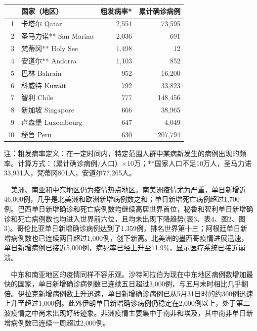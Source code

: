 \documentclass[
]{article}
\begin{document}
\begin{table}[H]
\begin{minipage}{.7\linewidth}
\begin{table}[H]
\begin{tabular}{rlrr}
\toprule
  & 国家（地区） & 粗发病率* & 累计确诊病例\\
\midrule
\rowcolor{gray!6}  1 & 卡塔尔 Qatar & 2,554 & 73,595\\
2 & 圣马力诺** San Marino & 2,036 & 691\\
\rowcolor{gray!6}  3 & 梵蒂冈** Holy See & 1,498 & 12\\
4 & 安道尔** Andorra & 1,103 & 852\\
\rowcolor{gray!6}  5 & 巴林 Bahrain & 952 & 16,200\\
6 & 科威特 Kuwait & 792 & 33,823\\
\rowcolor{gray!6}  7 & 智利 Chile & 777 & 148,456\\
8 & 新加坡 Singapore & 666 & 38,965\\
\rowcolor{gray!6}  9 & 卢森堡 Luxembourg & 647 & 4,049\\
10 & 秘鲁 Peru & 630 & 207,794\\
\bottomrule
\end{tabular}
\endgroup{}
\end{table} \end{minipage}
    \begin{tablenotes}
        \fontsize{15}{15}
        \selectfont
        \item 注：粗发病率定义：在一定时间内，特定范围人群中某病新发生的病例出现的频率。计算方式：（累计确诊病例/人口）×10万；**国家人口不足10万人，圣马力诺33,931人，梵蒂冈801人，安道尔77,265人。  %
      \end{tablenotes}
\end{table}

\(\quad\)美洲、南亚和中东地区仍为疫情热点地区。南美洲疫情尤为严重，单日新增近46,000例，几乎是北美洲和欧洲新增病例数之和；单日新增死亡病例超过1,700例。巴西单日新增确诊和死亡病例数均继续高居世界首位，秘鲁和智利单日新增确诊和死亡病例数也均进入世界前六位，且均未出现下降趋势(表3、表4、图2、图3)。哥伦比亚单日新增确诊病例达到了1,359例，排名世界第十三；阿根廷单日新增病例数也已连续两日超过1,000例，创下新高。北美洲的墨西哥疫情进展迅速，单日新增病例已接近5,000例，病死率已经上升至11.9\%，显示医疗系统已接近崩溃。

\(\quad\)中东和南亚地区的疫情同样不容乐观。沙特阿拉伯为现在中东地区病例数增加最快的国家，单日新增确诊病例数已连续五日超过3,000例，与五月末时相比几乎翻倍。伊拉克新增病例数上升迅速，单日新增确诊病例已从5月31日时的约300例迅速上升至超过1,000例。此外伊朗单日新增确诊病例仍稳定在2,000例以上，处于第二波疫情之中尚未出现好转迹象。非洲疫情主要集中于南非和埃及，其中南非单日新增病例数已连续一周超过2,000例。
\end{document}
